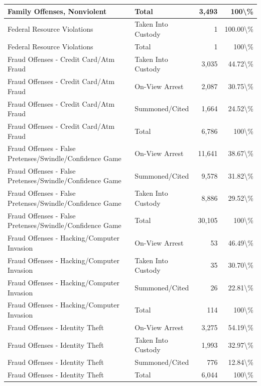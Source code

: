 \documentclass[
]{krantz}
\begin{document}
\begin{longtable}[t]{l|l|r|r}
\hline
Family Offenses, Nonviolent & Total & 3,493 & 100\textbackslash{}\%\\
\hline
Federal Resource Violations & Taken Into Custody & 1 & 100.00\textbackslash{}\%\\
\hline
Federal Resource Violations & Total & 1 & 100\textbackslash{}\%\\
\hline
Fraud Offenses - Credit Card/Atm Fraud & Taken Into Custody & 3,035 & 44.72\textbackslash{}\%\\
\hline
Fraud Offenses - Credit Card/Atm Fraud & On-View Arrest & 2,087 & 30.75\textbackslash{}\%\\
\hline
Fraud Offenses - Credit Card/Atm Fraud & Summoned/Cited & 1,664 & 24.52\textbackslash{}\%\\
\hline
Fraud Offenses - Credit Card/Atm Fraud & Total & 6,786 & 100\textbackslash{}\%\\
\hline
Fraud Offenses - False Pretenses/Swindle/Confidence Game & On-View Arrest & 11,641 & 38.67\textbackslash{}\%\\
\hline
Fraud Offenses - False Pretenses/Swindle/Confidence Game & Summoned/Cited & 9,578 & 31.82\textbackslash{}\%\\
\hline
Fraud Offenses - False Pretenses/Swindle/Confidence Game & Taken Into Custody & 8,886 & 29.52\textbackslash{}\%\\
\hline
Fraud Offenses - False Pretenses/Swindle/Confidence Game & Total & 30,105 & 100\textbackslash{}\%\\
\hline
Fraud Offenses - Hacking/Computer Invasion & On-View Arrest & 53 & 46.49\textbackslash{}\%\\
\hline
Fraud Offenses - Hacking/Computer Invasion & Taken Into Custody & 35 & 30.70\textbackslash{}\%\\
\hline
Fraud Offenses - Hacking/Computer Invasion & Summoned/Cited & 26 & 22.81\textbackslash{}\%\\
\hline
Fraud Offenses - Hacking/Computer Invasion & Total & 114 & 100\textbackslash{}\%\\
\hline
Fraud Offenses - Identity Theft & On-View Arrest & 3,275 & 54.19\textbackslash{}\%\\
\hline
Fraud Offenses - Identity Theft & Taken Into Custody & 1,993 & 32.97\textbackslash{}\%\\
\hline
Fraud Offenses - Identity Theft & Summoned/Cited & 776 & 12.84\textbackslash{}\%\\
\hline
Fraud Offenses - Identity Theft & Total & 6,044 & 100\textbackslash{}\%\\

\end{longtable}
\end{document}
